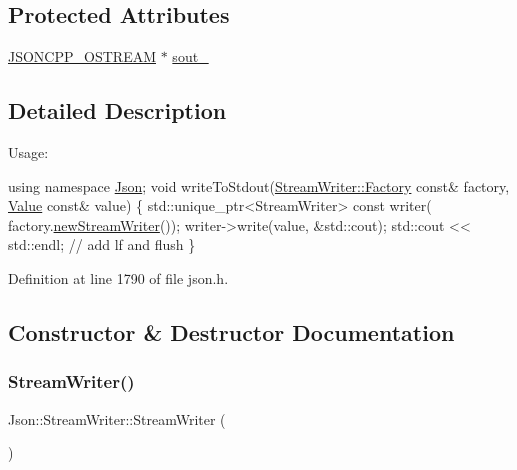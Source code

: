 \subsection*{Protected Attributes}
\begin{DoxyCompactItemize}
\item 
\hyperlink{json_8h_a37a25be5fca174927780caeb280094ce}{J\+S\+O\+N\+C\+P\+P\+\_\+\+O\+S\+T\+R\+E\+AM} $\ast$ \hyperlink{class_json_1_1_stream_writer_a4f5603d4228a9fa46a42cb44e5234d9b}{sout\+\_\+}
\end{DoxyCompactItemize}


\subsection{Detailed Description}
Usage\+: 
\begin{DoxyCode}
\textcolor{keyword}{using namespace }\hyperlink{namespace_json}{Json};
\textcolor{keywordtype}{void} writeToStdout(\hyperlink{class_json_1_1_stream_writer_1_1_factory}{StreamWriter::Factory} \textcolor{keyword}{const}& factory, 
      \hyperlink{class_json_1_1_value}{Value} \textcolor{keyword}{const}& value) \{
  std::unique\_ptr<StreamWriter> \textcolor{keyword}{const} writer(
    factory.\hyperlink{class_json_1_1_stream_writer_1_1_factory_a9d30ec53e8288cd53befccf1009c5f31}{newStreamWriter}());
  writer->write(value, &std::cout);
  std::cout << std::endl;  \textcolor{comment}{// add lf and flush}
\}
\end{DoxyCode}
 

Definition at line 1790 of file json.\+h.



\subsection{Constructor \& Destructor Documentation}
\mbox{\label{class_json_1_1_stream_writer_a66e6f5113618ce6b04cac9b3c85a3707}} 
\subsubsection{\texorpdfstring{Stream\+Writer()}{StreamWriter()}}
{\footnotesize\ttfamily Json\+::\+Stream\+Writer\+::\+Stream\+Writer (\begin{DoxyParamCaption}{ }\end{DoxyParamCaption})}



